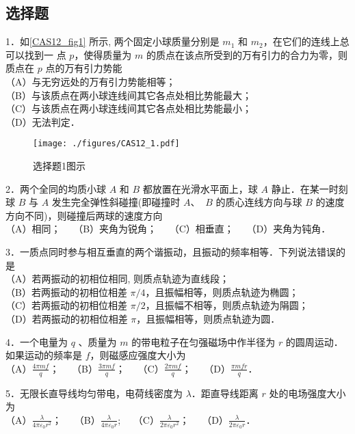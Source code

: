 \subsection{选择题}
1．如\autoref{CAS12_fig1} 所示, 两个固定小球质量分别是 $m_{1}$ 和 $m_{2}$，在它们的连线上总可以找到一
点 $p$，使得质量为 $m$ 的质点在该点所受到的万有引力的合力为零，则质点在 $p$
点的万有引力势能\\
（A）与无穷远处的万有引力势能相等；\\
（B）与该质点在两小球连线间其它各点处相比势能最大；\\
（C）与该质点在两小球连线间其它各点处相比势能最小；\\
（D）无法判定．
\begin{figure}[ht]
\centering
\texttt{[image: ./figures/CAS12\_1.pdf]}
\caption{选择题1图示} \label{CAS12_fig1}
\end{figure}
2．两个全同的均质小球 ${A}$ 和 ${B}$ 都放置在光滑水平面上，球 ${A}$ 静止．在某一时刻球 ${B}$ 与 ${A}$ 发生完全弹性斜碰撞(即碰撞时 ${A}$、 ${~B}$ 的质心连线方向与球 ${B}$ 的速度方向不同)，则碰撞后两球的速度方向\\
（A）相同；$\quad$
（B）夹角为锐角；$\quad$
（C）相垂直；$\quad$
（D）夹角为钝角．

3．一质点同时参与相互垂直的两个谐振动，且振动的频率相等．下列说法错误的是\\
（A）若两振动的初相位相同, 则质点轨迹为直线段；\\
（B）若两振动的初相位相差 $\pi / 4$，且振幅相等，则质点轨迹为椭圆；\\
（C）若两振动的初相位相差 $\pi / 2$，且振幅不相等，则质点轨迹为䧎圆；\\
（D）若两振动的初相位相差 $\pi$，且振幅相等，则质点轨迹为圆．

4．一个电量为 $q$ 、质量为 $m$ 的带电粒子在匀强磁场中作半径为 $r$ 的圆周运动．如果运动的频率是 $f$，则磁感应强度大小为\\
（A）$\frac{4 \pi m f}{q}$；$\quad$
（B）$\frac{3 \pi m f}{q}$；$\quad$
（C）$\frac{2 \pi m f}{q}$；$\quad$
（D）$\frac{\pi m f r}{q}$．

5．无限长直导线均匀带电，电荷线密度为 $\lambda$．距直导线距离 $r$ 处的电场强度大小为\\
（A）$\frac{\lambda}{4 \pi \varepsilon_{0} r^{2}}$；$\quad$
（B）$\frac{\lambda}{4 \pi \varepsilon_{0} r}$;$\quad$
（C）$\frac{\lambda}{2 \pi \varepsilon_{0} r^{2}}$；$\quad$
（D）$\frac{\lambda}{2 \pi \varepsilon_{0} r}$．

